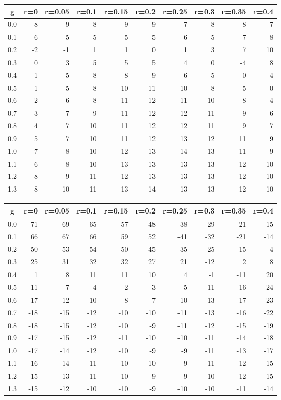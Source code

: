 %
\begin{table}[!tbp]
 \begin{center}
 \begin{tabular}{rrrrrrrrrr}\hline\hline
\multicolumn{1}{c}{g}&\multicolumn{1}{c}{r=0}&\multicolumn{1}{c}{r=0.05}&\multicolumn{1}{c}{r=0.1}&\multicolumn{1}{c}{r=0.15}&\multicolumn{1}{c}{r=0.2}&\multicolumn{1}{c}{r=0.25}&\multicolumn{1}{c}{r=0.3}&\multicolumn{1}{c}{r=0.35}&\multicolumn{1}{c}{r=0.4}\tabularnewline
\hline
0.0&-8&-9&-8&-9&-9& 7& 8& 8& 7\tabularnewline
0.1&-6&-5&-5&-5&-5& 6& 5& 7& 8\tabularnewline
0.2&-2&-1& 1& 1& 0& 1& 3& 7&10\tabularnewline
0.3& 0& 3& 5& 5& 5& 4& 0&-4& 8\tabularnewline
0.4& 1& 5& 8& 8& 9& 6& 5& 0& 4\tabularnewline
0.5& 1& 5& 8&10&11&10& 8& 5& 0\tabularnewline
0.6& 2& 6& 8&11&12&11&10& 8& 4\tabularnewline
0.7& 3& 7& 9&11&12&12&11& 9& 6\tabularnewline
0.8& 4& 7&10&11&12&12&11& 9& 7\tabularnewline
0.9& 5& 7&10&11&12&13&12&11& 9\tabularnewline
1.0& 7& 8&10&12&13&14&13&11& 9\tabularnewline
1.1& 6& 8&10&13&13&13&13&12&10\tabularnewline
1.2& 8& 9&11&12&13&13&13&12&10\tabularnewline
1.3& 8&10&11&13&14&13&13&12&10\tabularnewline
\hline
\end{tabular}

\end{center}

\end{table}

%
\begin{table}[!tbp]
 \begin{center}
 \begin{tabular}{rrrrrrrrrr}\hline\hline
\multicolumn{1}{c}{g}&\multicolumn{1}{c}{r=0}&\multicolumn{1}{c}{r=0.05}&\multicolumn{1}{c}{r=0.1}&\multicolumn{1}{c}{r=0.15}&\multicolumn{1}{c}{r=0.2}&\multicolumn{1}{c}{r=0.25}&\multicolumn{1}{c}{r=0.3}&\multicolumn{1}{c}{r=0.35}&\multicolumn{1}{c}{r=0.4}\tabularnewline
\hline
0.0& 71& 69& 65& 57& 48&-38&-29&-21&-15\tabularnewline
0.1& 66& 67& 66& 59& 52&-41&-32&-21&-14\tabularnewline
0.2& 50& 53& 54& 50& 45&-35&-25&-15& -4\tabularnewline
0.3& 25& 31& 32& 32& 27& 21&-12&  2&  8\tabularnewline
0.4&  1&  8& 11& 11& 10&  4& -1&-11& 20\tabularnewline
0.5&-11& -7& -4& -2& -3& -5&-11&-16& 24\tabularnewline
0.6&-17&-12&-10& -8& -7&-10&-13&-17&-23\tabularnewline
0.7&-18&-15&-12&-10&-10&-11&-13&-16&-22\tabularnewline
0.8&-18&-15&-12&-10& -9&-11&-12&-15&-19\tabularnewline
0.9&-17&-15&-12&-11&-10&-10&-11&-14&-18\tabularnewline
1.0&-17&-14&-12&-10& -9& -9&-11&-13&-17\tabularnewline
1.1&-16&-14&-11&-10&-10& -9&-11&-12&-15\tabularnewline
1.2&-15&-13&-11&-10& -9& -9&-10&-12&-15\tabularnewline
1.3&-15&-12&-10&-10& -9&-10&-10&-11&-14\tabularnewline
\hline
\end{tabular}

\end{center}

\end{table}


